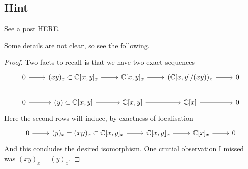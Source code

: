 \subsection{Hint}

See a post \href{https://math.stackexchange.com/questions/3769097/showing-that-mathbbcx-y-xy-x-cong-mathbbcx-x}{HERE}.

Some details are not clear, so see the following.
\begin{proof}
    Two facts to recall is that we have two exact sequences 
\[\begin{tikzcd}
	0 & {(xy)_x\subset \mathbb C[x,y]_x} & {\mathbb C[x,y]_x} & {(\mathbb C[x,y]/(xy))_x} & 0 \\
	0 & {(y)\subset \mathbb C[x,y]} & {\mathbb C[x,y]} & {\mathbb C[x]} & 0
	\arrow[from=1-1, to=1-2]
	\arrow[from=1-2, to=1-3]
	\arrow[from=1-3, to=1-4]
	\arrow[from=1-4, to=1-5]
	\arrow[from=2-1, to=2-2]
	\arrow[from=2-4, to=2-5]
	\arrow[from=2-3, to=2-4]
	\arrow[from=2-2, to=2-3]
\end{tikzcd}\]
Here the second rows will induce, by exactness of localisation 
\[\begin{tikzcd}
	0 & {(y)_x=(xy)_x\subset \mathbb C[x,y]_x} & {\mathbb C[x,y]_x} & {\mathbb C[x]_x} & 0
	\arrow[from=1-1, to=1-2]
	\arrow[from=1-4, to=1-5]
	\arrow[from=1-3, to=1-4]
	\arrow[from=1-2, to=1-3]
\end{tikzcd}\]
And this concludes the desired isomorphism. One crutial observation I missed was $(xy)_x=(y)_x$.

\end{proof}